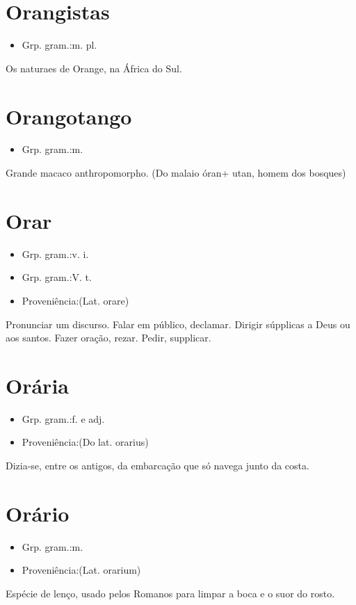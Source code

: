 \section{Orangistas}
\begin{itemize}
\item {Grp. gram.:m. pl.}
\end{itemize}
Os naturaes de Orange, na África do Sul.
\section{Orangotango}
\begin{itemize}
\item {Grp. gram.:m.}
\end{itemize}
Grande macaco anthropomorpho.
(Do malaio \textunderscore óran\textunderscore  + \textunderscore utan\textunderscore , homem dos bosques)
\section{Orar}
\begin{itemize}
\item {Grp. gram.:v. i.}
\end{itemize}
\begin{itemize}
\item {Grp. gram.:V. t.}
\end{itemize}
\begin{itemize}
\item {Proveniência:(Lat. \textunderscore orare\textunderscore )}
\end{itemize}
Pronunciar um discurso.
Falar em público, declamar.
Dirigir súpplicas a Deus ou aos santos.
Fazer oração, rezar.
Pedir, supplicar.
\section{Orária}
\begin{itemize}
\item {Grp. gram.:f.  e  adj.}
\end{itemize}
\begin{itemize}
\item {Proveniência:(Do lat. \textunderscore orarius\textunderscore )}
\end{itemize}
Dizia-se, entre os antigos, da embarcação que só navega junto da costa.
\section{Orário}
\begin{itemize}
\item {Grp. gram.:m.}
\end{itemize}
\begin{itemize}
\item {Proveniência:(Lat. \textunderscore orarium\textunderscore )}
\end{itemize}
Espécie de lenço, usado pelos Romanos para limpar a boca e o suor do rosto.
